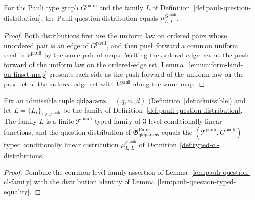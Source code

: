 \begin{lemma}\label{lem:pauli-question-typed-equality}
	\leanok
	For the Pauli type graph $G^{\mathrm{pauli}}$ and the family $L$ of Definition~\ref{def:pauli-question-distribution}, the Pauli question distribution equals $\mu^{G^{\mathrm{pauli}}}_{L,L}$.
\end{lemma}
\begin{proof}
	\leanok
	Both distributions first use the uniform law on ordered pairs whose unordered pair is an edge of $G^{\mathrm{pauli}}$, and then push forward a common uniform seed in $V^{\mathrm{pauli}}$ by the same pair of maps. Writing the ordered-edge law as the push-forward of the uniform law on the ordered-edge set, Lemma~\ref{lem:uniform-bind-on-finset-map} presents each side as the push-forward of the uniform law on the product of the ordered-edge set with $V^{\mathrm{pauli}}$ along the same map.
\end{proof}

\begin{lemma}\label{lem:pauli-question-typed-cl}
	\leanok
	Fix an admissible tuple $\mathsf{qldparams} = (q,m,d)$ (Definition~\ref{def:admissible}) and let $L = \{L_t\}_{t \in \mathcal T^{\mathrm{pauli}}}$ be the family of Definition~\ref{def:pauli-question-distribution}. The family $L$ is a finite $\mathcal T^{\mathrm{pauli}}$-typed family of $3$-level conditionally linear functions, and the question distribution of $\mathfrak{G}^{\mathrm{Pauli}}_{\mathsf{qldparams}}$ equals the $(\mathcal T^{\mathrm{pauli}}, G^{\mathrm{pauli}})$-typed conditionally linear distribution $\mu^{G^{\mathrm{pauli}}}_{L,\,L}$ of Definition~\ref{def:typed-cl-distributions}.
\end{lemma}
\begin{proof}
	\leanok
	Combine the common-level family assertion of Lemma~\ref{lem:pauli-question-cl-family} with the distribution identity of Lemma~\ref{lem:pauli-question-typed-equality}.
\end{proof}

